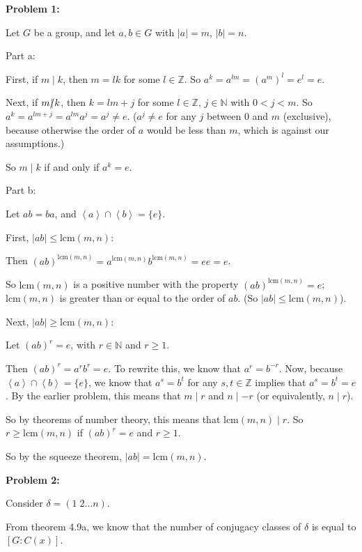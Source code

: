 \documentclass[a4paper,12pt]{article}
\newcommand{\tab}{\hspace{4mm}} %
\newcommand{\shunt}{\vspace{20mm}}
\newcommand{\absval}[1]{\lvert #1 \rvert}
\newcommand{\anbrack}[1]{\left\langle #1 \right\rangle}
\newcommand{\de}{\delta}
\newcommand{\N}{\mathbb{N}}
\newcommand{\Z}{\mathbb{Z}}
\begin{document}
{\bf Problem 1:}

Let $G$ be a group, and let $a, b \in G$ with $\absval{a} = m$, $\absval{b} = n$.

Part a:

First, if $m \mid k$, then $m = lk$ for some $l \in \Z$. So $a^k = a^{lm} = (a^{m})^l = e^l = e$.

Next, if $m \slashed{\mid} k$, then $k = lm + j$ for some $l \in \Z$, $j \in \N$ with $0 < j < m$. So $a^k = a^{lm+j} = a^{lm}a^j=a^j \neq e$. ($a^j \neq e$ for any $j$ between $0$ and $m$ (exclusive), because otherwise the order of $a$ would be less than $m$, which is against our assumptions.)

So $m \mid k$ if and only if $a^k = e$.

\shunt

Part b: %

Let $ab=ba$, and $\anbrack{a} \cap \anbrack{b} = \{e\}$.

First, $\absval{ab} \leq \text{lcm}(m,n)$:

\tab Then $(ab)^{\text{lcm}(m,n)} = a^{\text{lcm}(m,n)}b^{\text{lcm}(m,n)} = ee=e$.

\tab So ${\text{lcm}(m,n)}$ is a positive number with the property $(ab)^{\text{lcm}(m,n)} =e$; $\text{lcm}(m,n)$ is greater than or equal to the order of $ab$. (So $\absval{ab} \leq \text{lcm}(m,n)$).

Next, $\absval{ab} \geq \text{lcm}(m,n)$:

\tab Let $(ab)^r = e$, with $r \in \N$ and $r \geq 1$.

\tab Then $(ab)^r = a^rb^r = e$. To rewrite this, we know that $a^r = b^{-r}$. Now, because $\anbrack{a} \cap \anbrack{b} = \{e\}$, we know that $a^s = b^t$ for any $s, t \in \Z$ implies that $a^s = b^t = e$. By the earlier problem, this means that $m \mid r$ and $n \mid -r$ (or equivalently, $n \mid r$).

\tab So by theorems of number theory, this means that $\text{lcm}(m,n) \mid r$. So $r \geq \text{lcm}(m,n)$ if $(ab)^r = e$ and $r \geq 1$.

So by the squeeze theorem, $\absval{ab} = \text{lcm}(m,n)$.

\shunt

{\bf Problem 2:}

Consider $\de = (1 \; 2 \ldots n)$.

From theorem 4.9a, we know that the number of conjugacy classes of $\de$ is equal to $[G:C(x)]$.
\end{document}
